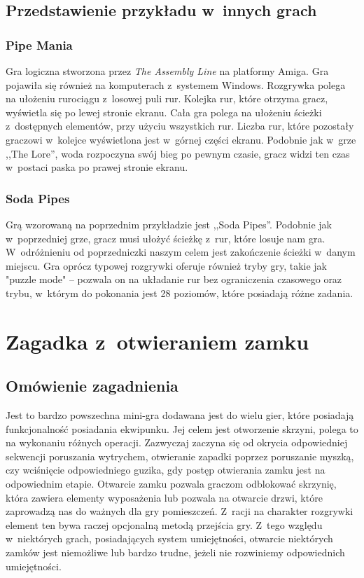 \documentclass[oneside,polski,logo]{amuthesis}
\begin{document}
\subsection{Przedstawienie przykładu w~innych grach}
\subsubsection{Pipe Mania}
\par Gra logiczna stworzona przez \emph{The Assembly Line} na platformy Amiga. Gra pojawiła się również na komputerach z~systemem Windows. Rozgrywka polega na ułożeniu rurociągu z~losowej puli rur. Kolejka rur, które otrzyma gracz, wyświetla się po lewej stronie ekranu. Cała gra polega na ułożeniu ścieżki z~dostępnych elementów, przy użyciu wszystkich rur. Liczba rur, które pozostały graczowi w~kolejce wyświetlona jest w~górnej części ekranu. Podobnie jak w~grze ,,The Lore'', woda rozpoczyna swój bieg po pewnym czasie, gracz widzi ten czas w~postaci paska po prawej stronie ekranu. \cite{pipemania}

\subsubsection{Soda Pipes}
\par Grą wzorowaną na poprzednim przykładzie jest ,,Soda Pipes''. Podobnie jak w~poprzedniej grze, gracz musi ułożyć ścieżkę z~rur, które losuje nam gra. W~odróżnieniu od poprzedniczki naszym celem jest zakończenie ścieżki w~danym miejscu. Gra oprócz typowej rozgrywki oferuje również tryby gry, takie jak "puzzle mode" – pozwala on na układanie rur bez ograniczenia czasowego oraz trybu, w~którym do pokonania jest 28 poziomów, które posiadają różne zadania. \cite{sp}

\section{Zagadka z~otwieraniem zamku}
\subsection{Omówienie zagadnienia}
\par Jest to bardzo powszechna mini-gra dodawana jest do wielu gier, które posiadają funkcjonalność posiadania ekwipunku. Jej celem jest otworzenie skrzyni, polega to na wykonaniu różnych operacji. Zazwyczaj zaczyna się od okrycia odpowiedniej sekwencji poruszania wytrychem, otwieranie zapadki poprzez poruszanie myszką, czy wciśnięcie odpowiedniego guzika, gdy postęp otwierania zamku jest na odpowiednim etapie. Otwarcie zamku pozwala graczom odblokować skrzynię, która zawiera elementy wyposażenia lub pozwala na otwarcie drzwi, które zaprowadzą nas do ważnych dla gry pomieszczeń. Z~racji na charakter rozgrywki element ten bywa raczej opcjonalną metodą przejścia gry. Z~tego względu w~niektórych grach, posiadających system umiejętności, otwarcie niektórych zamków jest niemożliwe lub bardzo trudne, jeżeli nie rozwiniemy odpowiednich umiejętności.
\end{document}
